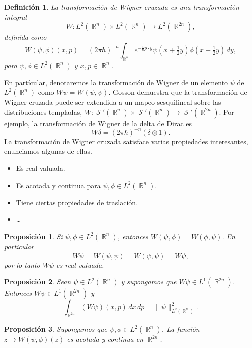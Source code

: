 \documentclass[a4paper]{report}
\DeclareMathOperator{\R}{\mathbb{R}}
\DeclareMathOperator{\Sz}{\mathcal S}
\newtheorem{definition}{Definición}
\newtheorem{proposition}{Proposición}
\begin{document}
  \begin{definition}
    La transformación de Wigner cruzada es una
    transformación integral
    \[
      W : L^2(\R^{n}) \times L^2(\R^{n}) \to L^2(\R^{2n}),
    \]
    definida como
    \begin{equation}
      \label{eqn:cross_wigner_transform}
      W(\psi,\phi)(x,p)
      = (2\pi\hbar)^{-n} \int_{\R^{n}} e^{-\frac{i}{\hbar} p
      \cdot y} \psi(x + \tfrac{1}{2}y) \overline{\phi(x -
      \tfrac{1}{2}y)} \, dy,
    \end{equation}
    para $\psi, \phi \in L^2(\R^{n})$ y $x,p \in \R^{n}$.  
  \end{definition}
  En partícular, denotaremos la transformación de Wigner de
  un elemento $\psi$ de $L^2(\R^{n})$ como $W\psi =
  W(\psi,\psi)$. Gosson demuestra que la transformación de
  Wigner cruzada puede ser extendida a un mapeo sesquilineal
  sobre las distribuciones templadas, $W : \Sz'(\R^{n})
  \times \Sz'(\R^{n}) \to \Sz'(\R^{2n})$. Por ejemplo, la
  transformación de Wigner de la delta de Dirac es
  \[
    W\delta = (2\pi\hbar)^{-n} (\delta \otimes 1).
  \] 
  La transformación de Wigner cruzada satisface varias
  propiedades interesantes, enunciamos algunas de ellas.
  \begin{itemize}
    \item Es real valuada.
    \item Es acotada y continua para $\psi,\phi \in
      L^2(\R^{n})$.
    \item Tiene ciertas propiedades de traslación.
    \item \ldots
  \end{itemize}
  \begin{proposition}
    Si $\psi, \phi \in L^2(\R^{n})$, entonces $W(\psi,\phi)
    = \overline{W}(\phi,\psi)$. En particular
    \[
      W\psi
      = W(\psi,\psi)
      = \overline{W}(\psi,\psi)
      = \overline{W\psi},
    \] 
    por lo tanto $W\psi$ es real-valuada. 
  \end{proposition}
  
  \begin{proposition}
    Sean $\psi \in L^2(\R^{n})$ y supongamos que $W\psi \in
    L^{1}(\R^{2n})$. Entonces $W\psi \in L^{1}(\R^{2n})$ y
    \begin{equation}
      \int_{\R^{2n}} (W\psi)(x,p) \, dx \, dp 
      = \|\psi\|^2_{L^2(\R^{n})}.
    \end{equation}
  \end{proposition}

  \begin{proposition}
    Supongamos que $\psi, \phi \in L^2(\R^{n})$. La función
    $z \mapsto W(\psi,\phi)(z)$ es acotada y continua en
    $\R^{2n}$.
  \end{proposition}
\end{document}
